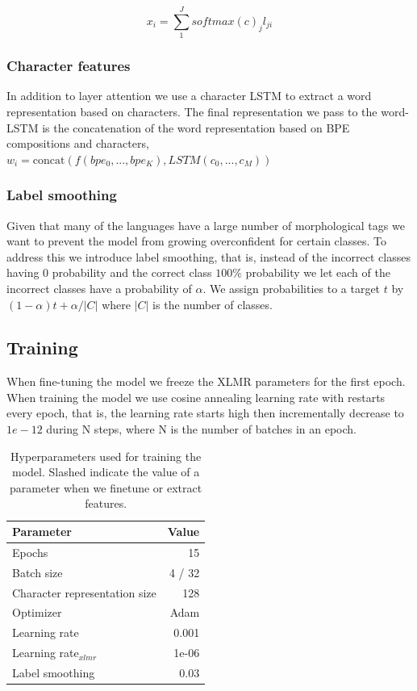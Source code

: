 \documentclass[11pt]{article}
\begin{document}
	\begin{equation}
		x_i = \sum_{1}^{J} softmax(c)_j l_{ji}
	\end{equation}
	
	\subsubsection{Character features}
	In addition to layer attention we use a character LSTM to extract a word representation based on characters. The final representation we pass to the word-LSTM is the concatenation of the word representation based on BPE compositions and characters, $w_i = \text{concat}(f(bpe_0,...,bpe_K), LSTM(c_0, ..., c_M))$
	
	\subsubsection{Label smoothing}
	Given that many of the languages have a large number of morphological tags we want to prevent the model from growing overconfident for certain classes. To address this we introduce label smoothing, that is, instead of the incorrect classes having 0 probability and the correct class $100\%$ probability we let each of the incorrect classes have a probability of $\alpha$. We assign probabilities to a target $t$ by $(1-\alpha)t + \alpha / |C|$ where $|C|$ is the number of classes. 
	

	
	\subsection{Training}
	
	When fine-tuning the model we freeze the XLMR parameters for the first epoch.
	When training the model we use cosine annealing learning rate with restarts every epoch, that is, the learning rate starts high then incrementally decrease to $1e-12$ during N steps, where N is the number of batches in an epoch.
	
	\begin{table}[h]
		\centering
		\begin{tabular}{lr}
			Parameter & Value \\
			\hline
			Epochs & 15 \\
			Batch size & 4 / 32 \\
			Character representation size & 128 \\
			Optimizer & Adam \\
			Learning rate & 0.001 \\
			Learning rate$_{xlmr}$ & 1e-06 \\
			Label smoothing & 0.03 \\
			
		\end{tabular}
		\caption{\label{tab:parameters} Hyperparameters used for training the model. Slashed indicate the value of a parameter when we finetune or extract features.}
	\end{table}
\end{document}
